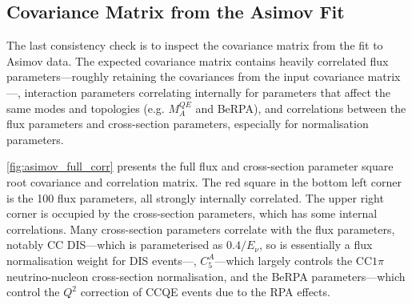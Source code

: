 \subsection{Covariance Matrix from the Asimov Fit}
\label{sec:covariance_asimov}
The last consistency check is to inspect the covariance matrix from the fit to Asimov data. The expected covariance matrix contains heavily correlated flux parameters---roughly retaining the covariances from the input covariance matrix---, interaction parameters correlating internally for parameters that affect the same modes and topologies (e.g. $M_A^{QE}$ and BeRPA), and correlations between the flux parameters and cross-section parameters, especially for normalisation parameters.

\autoref{fig:asimov_full_corr} presents the full flux and cross-section parameter square root covariance and correlation matrix. The red square in the bottom left corner is the 100 flux parameters, all strongly internally correlated. The upper right corner is occupied by the cross-section parameters, which has some internal correlations. Many cross-section parameters correlate with the flux parameters, notably CC DIS---which is parameterised as $0.4/E_\nu$, so is essentially a flux normalisation weight for DIS events---, $C_5^A$---which largely controls the CC$1\pi$ neutrino-nucleon cross-section normalisation, and the BeRPA parameters---which control the $Q^2$ correction of CCQE events due to the RPA effects.
